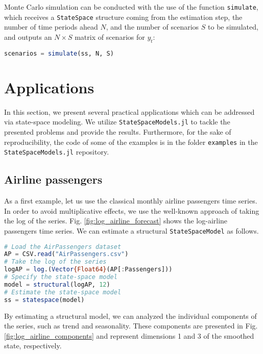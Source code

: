 \documentclass{juliacon}
\begin{document}
Monte Carlo simulation can be conducted with the use of the function \texttt{simulate}, which receives a \texttt{StateSpace} structure coming from the estimation step, the number of time periods ahead $N$, and the number of scenarios $S$ to be simulated, and outputs an $N \times S$ matrix of scenarios for $y_{t}$:
%
\begin{lstlisting}[language = Julia]
scenarios = simulate(ss, N, S)
\end{lstlisting}

\section{Applications} \label{sec:applications}

In this section, we present several practical applications which can be addressed via state-space modeling. We utilize \texttt{StateSpaceModels.jl} to tackle the presented problems and provide the results. Furthermore, for the sake of reproducibility, the code of some of the examples is in the folder \texttt{examples} in the \texttt{StateSpaceModels.jl} repository.

\subsection{Airline passengers}

As a first example, let us use the classical monthly airline passengers time series. In order to avoid multiplicative effects, we use the well-known approach of taking the log of the series. Fig. \ref{fig:log_airline_forecast} shows the log-airline passengers time series. We can estimate a structural \texttt{StateSpaceModel} as follows.
%
\begin{lstlisting}[language = Julia]
# Load the AirPassengers dataset
AP = CSV.read("AirPassengers.csv")
# Take the log of the series
logAP = log.(Vector{Float64}(AP[:Passengers]))
# Specify the state-space model
model = structural(logAP, 12)
# Estimate the state-space model
ss = statespace(model)
\end{lstlisting}

By estimating a structural model, we can analyzed the individual components of the series, such as trend and seasonality. These components are presented in Fig. \ref{fig:log_airline_components} and represent dimensions 1 and 3 of the smoothed state, respectively.
\end{document}

